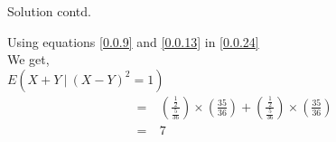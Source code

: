 \documentclass{beamer}
\providecommand{\brak}[1]{\ensuremath{\left(#1\right)}}
\begin{document}
\begin{frame}{Solution contd.}
    \begin{block}{}
        Using equations \eqref{0.0.9} and \eqref{0.0.13} in \eqref{0.0.24}\\
        We get,\\
        \newline
        $E\brak{X+Y\:|\:(X-Y)^2=1}$
        \begin{align}
            =&\:\brak{\frac{\frac{1}{2}}{\frac{5}{36}}}\times\brak{\frac{35}{36}}+\brak{\frac{\frac{1}{2}}{\frac{5}{36}}}\times\brak{\frac{35}{36}}\\
            =&\:7
        \end{align}
    \end{block}
\end{frame}
\end{document}
